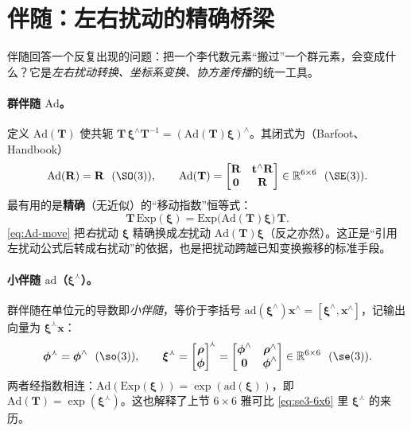 \section{伴随：左右扰动的精确桥梁}
\label{sec:adjoint}

伴随回答一个反复出现的问题：把一个李代数元素“搬过”一个群元素，会变成什么？它是\emph{左右扰动转换、坐标系变换、协方差传播}的统一工具。

\paragraph{群伴随 $\mathrm{Ad}$。}定义 $\mathrm{Ad}(\mathbf{T})$ 使共轭 $\mathbf{T}\,\boldsymbol{\xi}^\wedge\mathbf{T}^{-1}=(\mathrm{Ad}(\mathbf{T})\boldsymbol{\xi})^\wedge$。其闭式为（Barfoot\cite{barfoot2024state}、Handbook\cite{carlone2026handbook}）
\begin{equation}
  \mathrm{Ad}(\mathbf{R})=\mathbf{R}\ \ (\SO(3)),\qquad
  \mathrm{Ad}(\mathbf{T})=\begin{bmatrix}\mathbf{R}&\mathbf{t}^\wedge\mathbf{R}\\\mathbf{0}&\mathbf{R}\end{bmatrix}\in\mathbb{R}^{6\times6}\ \ (\SE(3)).
  \label{eq:Ad}
\end{equation}
最有用的是\textbf{精确}（无近似）的“移动指数”恒等式：
\begin{equation}
  \mathbf{T}\,\mathrm{Exp}(\boldsymbol{\xi})=\mathrm{Exp}\big(\mathrm{Ad}(\mathbf{T})\boldsymbol{\xi}\big)\,\mathbf{T}.
  \label{eq:Ad-move}
\end{equation}
\cref{eq:Ad-move} 把\emph{右}扰动 $\boldsymbol{\xi}$ 精确换成\emph{左}扰动 $\mathrm{Ad}(\mathbf{T})\boldsymbol{\xi}$（反之亦然）。这正是“引用左扰动公式后转成右扰动”的依据，也是把扰动跨越已知变换搬移的标准手段。

\paragraph{小伴随 $\mathrm{ad}$（$\boldsymbol{\xi}^\curlywedge$）。}群伴随在单位元的导数即\emph{小伴随}，等价于李括号 $\mathrm{ad}(\boldsymbol{\xi}^\wedge)\mathbf{x}^\wedge=[\boldsymbol{\xi}^\wedge,\mathbf{x}^\wedge]$，记输出向量为 $\boldsymbol{\xi}^\curlywedge\mathbf{x}$：
\begin{equation}
  \boldsymbol{\phi}^\curlywedge=\boldsymbol{\phi}^\wedge\ \ (\so(3)),\qquad
  \boldsymbol{\xi}^\curlywedge=\begin{bmatrix}\boldsymbol{\rho}\\\boldsymbol{\phi}\end{bmatrix}^{\!\curlywedge}=\begin{bmatrix}\boldsymbol{\phi}^\wedge&\boldsymbol{\rho}^\wedge\\\mathbf{0}&\boldsymbol{\phi}^\wedge\end{bmatrix}\in\mathbb{R}^{6\times6}\ \ (\se(3)).
  \label{eq:ad}
\end{equation}
两者经指数相连：$\mathrm{Ad}(\mathrm{Exp}(\boldsymbol{\xi}))=\exp(\mathrm{ad}(\boldsymbol{\xi}))$，即 $\mathrm{Ad}(\mathbf{T})=\exp(\boldsymbol{\xi}^\curlywedge)$。这也解释了上节 $6\times6$ 雅可比 \cref{eq:se3-6x6} 里 $\boldsymbol{\xi}^\curlywedge$ 的来历。

